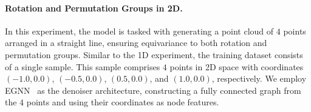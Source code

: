 \paragraph{Rotation and Permutation Groups in 2D.} 
In this experiment, the model is tasked with generating a point cloud of \( 4 \) points arranged in a straight line, ensuring equivariance to both rotation and permutation groups. Similar to the 1D experiment, the training dataset consists of a single sample. This sample comprises \( 4 \) points in 2D space with coordinates \((-1.0, 0.0)\), \((-0.5, 0.0)\), \((0.5, 0.0)\), and \((1.0, 0.0)\), respectively. We employ EGNN~ as the denoiser architecture, constructing a fully connected graph from the \( 4 \) points and using their coordinates as node features.




